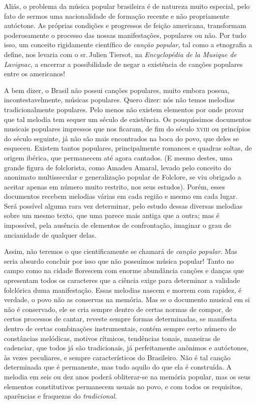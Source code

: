 Aliás, o problema da música popular brasileira é de natureza muito
especial, pelo fato de sermos uma nacionalidade de formação recente e
não propriamente autóctone. As próprias condições e progressos de feição
americana, transformam poderosamente o processo das nossas
manifestações, populares ou não. Por tudo isso, um conceito rigidamente
científico de \textit{canção popular}, tal como a etnografia a define, nos
levaria com o sr.\,Julien Tiersot, na \textit{Encyclopédia de la Musique de
Lavignac,} a encerrar a possibilidade de negar a existência de canções
populares entre os americanos!

A bem dizer, o Brasil não possui canções populares, muito embora possua,\label{dizer}
incontestavelmente, músicas populares. Quero dizer: nós não temos
melodias tradicionalmente populares. Pelo menos não existem elementos
por onde provar que tal melodia tem sequer um século de existência. Os
pouquíssimos documentos musicais populares impressos que nos ficaram, de
fim do século \textsc{xviii} ou princípios do século seguinte, já não são mais
encontrados na boca do povo, que deles se esqueceu. Existem tantos
populares, principalmente romances e quadras soltas, de origem ibérica,
que permanecem até agora cantados. (E mesmo destes, uma grande figura de
folclorista, como Amadeu Amaral, levado pelo conceito do anonimato
multissecular e generalização popular de Folclore, se viu obrigado a
aceitar apenas em número muito restrito, nos seus estudos). Porém, esses
documentos recebem melodias várias em cada região e mesmo em cada lugar.
Será possível alguma rara vez determinar, pelo estudo dessas diversas
melodias sobre um mesmo texto, que uma parece mais antiga que a outra;
mas é impossível, pela ausência de elementos de confrontação, imaginar o
grau de ancianidade de qualquer delas.

Assim, não teremos o que cientificamente se chamará de \textit{canção
popular}. Mas seria absurdo concluir por isso que não possuímos música
popular! Tanto no campo como na cidade florescem com enorme abundância
canções e danças que apresentam todos os caracteres que a ciência exige
para determinar a validade folclórica duma manifestação. Essas melodias
nascem e morrem com rapidez, é verdade, o povo não as conservas na
memória. Mas se o documento musical em si não é conservado, ele se cria
sempre dentro de certas normas de compor, de certos processos de cantar,
reveste sempre formas determinadas, se manifesta dentro de certas
combinações instrumentais, contém sempre certo número de constâncias
melódicas, motivos rítmicos, tendências tonais, maneiras de cadenciar,
que todos já são tradicionais, já perfeitamente anônimos e autóctones,
às vezes peculiares, e sempre característicos do Brasileiro. Não é tal
canção determinada que é permanente, mas tudo aquilo do que ela é
construída. A melodia em seis ou dez anos poderá obliterar-se na memória
popular, mas os seus elementos constitutivos permanecem usuais no povo,
e com todos os requisitos, aparências e fraquezas do \textit{tradicional}.

